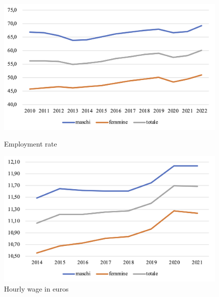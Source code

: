 \documentclass[12pt]{article}
\begin{document}
\begin{spacing}{1.5}
\begin{figure}
	\begin{minipage}[b]{0.5\textwidth}
		\begin{center}
			\includegraphics[width=\textwidth]{./images/employment-rate-gender.png}
		\end{center}
			\caption{Employment rate}
	\end{minipage}
	\begin{minipage}[b]{0.5\textwidth}
		\begin{center}
			\includegraphics[width=\textwidth]{./images/hourly-wage-gender.png}
		\end{center}
			\caption{Hourly wage in euros}
	\end{minipage}
\end{figure}


\end{spacing}
\end{document}
